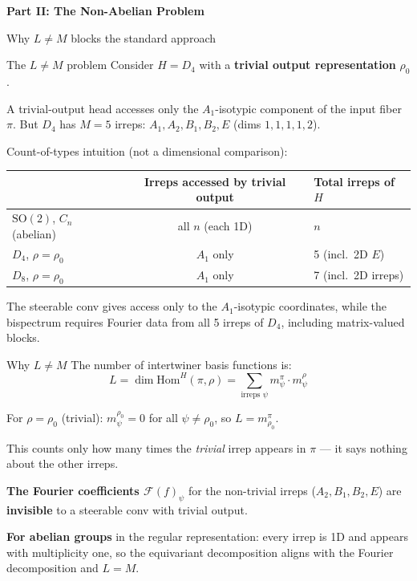 \documentclass[aspectratio=169]{beamer}
\newcommand{\FF}{\mathcal{F}}
\newcommand{\Hom}{\mathrm{Hom}}
\newcommand{\SO}{\mathrm{SO}}
\begin{document}
\begin{frame}{}
  \vfill
  \centering
  {\Large\textbf{Part II: The Non-Abelian Problem}}

  \medskip

  {\normalsize Why $L \neq M$ blocks the standard approach}
  \vfill
\end{frame}

\begin{frame}{The $L \neq M$ problem}
  Consider $H = D_4$ with a \textbf{trivial output representation} $\rho_0$.

  \medskip

  A trivial-output head accesses only the $A_1$-isotypic component of the input fiber $\pi$. But $D_4$ has $M = 5$ irreps: $A_1, A_2, B_1, B_2, E$ (dims $1,1,1,1,2$).

  \bigskip

  {\small Count-of-types intuition (not a dimensional comparison):}

  \centering\small
  \begin{tabular}{lcl}
    \toprule
    & Irreps accessed by trivial output & Total irreps of $H$ \\
    \midrule
    $\SO(2)$, $C_n$ (abelian) & all $n$ (each 1D) & $n$ \\
    $D_4$, $\rho = \rho_0$ & \alert{$A_1$ only} & \alert{5 (incl.\ 2D $E$)} \\
    $D_8$, $\rho = \rho_0$ & \alert{$A_1$ only} & \alert{7 (incl.\ 2D irreps)} \\
    \bottomrule
  \end{tabular}

  \raggedright

  \bigskip

  The steerable conv gives access only to the \alert{$A_1$-isotypic coordinates}, while the bispectrum requires \alert{Fourier data from all 5 irreps} of $D_4$, including matrix-valued blocks.
\end{frame}

\begin{frame}{Why $L \neq M$}
  The number of intertwiner basis functions is:
  \[
    L = \dim \Hom^H(\pi, \rho) = \sum_{\text{irreps }\psi} m^\pi_\psi \cdot m^\rho_\psi
  \]

  For $\rho = \rho_0$ (trivial): $m^{\rho_0}_\psi = 0$ for all $\psi \neq \rho_0$, so $L = m^\pi_{\rho_0}$.

  \bigskip

  This counts only how many times the \textit{trivial} irrep appears in $\pi$ --- it says nothing about the other irreps.

  \bigskip

  \textbf{The Fourier coefficients $\FF(f)_\psi$} for the non-trivial irreps ($A_2, B_1, B_2, E$) are \textbf{invisible} to a steerable conv with trivial output.

  \bigskip

  \textbf{For abelian groups} in the regular representation: every irrep is 1D and appears with multiplicity one, so the equivariant decomposition aligns with the Fourier decomposition and $L = M$.
\end{frame}
\end{document}
